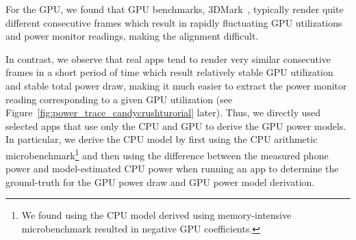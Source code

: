 \begin{sloppy}
For the GPU, we found that GPU benchmarks, \eg 3DMark~\cite{3DMark}, typically render quite different consecutive frames which
result in rapidly fluctuating GPU utilizations and power monitor readings,
making the alignment difficult. 
\end{sloppy}
%
%
In contrast, we observe that real apps tend to render very similar consecutive frames in a short period of time which result relatively stable GPU utilization and stable total power draw, 
making it much easier to extract the power monitor reading corresponding to a given GPU utilization
(see Figure~\ref{fig:power_trace_candycrushturorial} later). 
Thus, we directly used selected apps that use only the CPU and GPU to derive the GPU power models. 
In particular, we 
derive the CPU model by first using the 
CPU arithmetic microbenchmark\footnote{We found using the CPU model derived using memory-intensive microbenchmark resulted in negative GPU coefficients.} 
and then 
using the difference between the measured phone power and model-estimated CPU power when running an app  to determine the ground-truth for the GPU power draw and GPU power model derivation.



